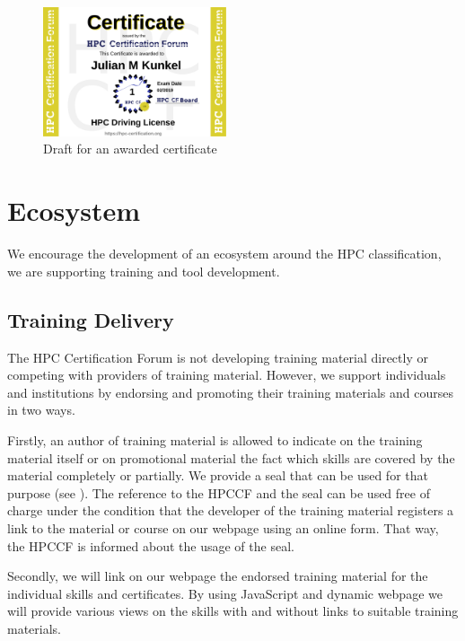 \documentclass[jocse]{jocseart}
\begin{document}
\begin{figure}
  \includegraphics[width=0.48\textwidth]{JulianMKunkel}
  \caption{Draft for an awarded certificate}
  \label{fig:awardedCertificate}
\end{figure}

\section{Ecosystem}
\label{sec:ecosystem}

We encourage the development of an ecosystem around the HPC classification, we are supporting training and tool development.

\subsection{Training Delivery}

The HPC Certification Forum is not developing training material directly or competing with providers of training material.
However, we support individuals and institutions by endorsing and promoting their training materials and courses in two ways.

Firstly, an author of training material is allowed to indicate on the training material itself or on promotional material the fact
which skills are covered by the material completely or partially.
We provide a seal that can be used for that purpose (see ).
The reference to the HPCCF and the seal can be used free of charge under the condition that the developer of the training material
registers a link to the material or course on our webpage using an online form. %
That way, the HPCCF is informed about the usage of the seal.

Secondly, we will link on our webpage the endorsed training material for the individual skills and certificates.
By using JavaScript and dynamic webpage we will provide various views on the skills with and without links to suitable training materials.
\end{document}
